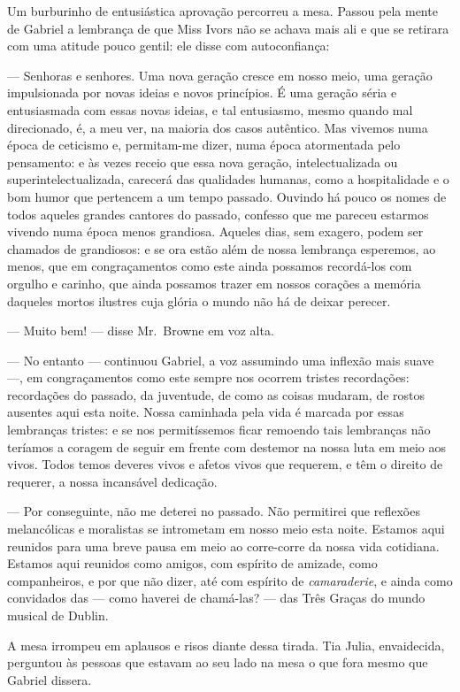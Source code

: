 Um burburinho de entusiástica aprovação percorreu a mesa.  Passou pela mente de
Gabriel a lembrança de que Miss Ivors não se achava mais ali e que se retirara
com uma atitude pouco gentil: ele disse com autoconfiança:

--- Senhoras e senhores.  Uma nova geração cresce em nosso meio, uma geração
impulsionada por novas ideias e novos princípios.  É uma geração séria e
entusiasmada com essas novas ideias, e tal entusiasmo, mesmo quando mal
direcionado, é, a meu ver, na maioria dos casos autêntico.  Mas vivemos numa
época de ceticismo e, permitam-me dizer, numa época atormentada pelo
pensamento: e às vezes receio que essa nova geração, intelectualizada ou
superintelectualizada, carecerá das qualidades humanas, como a hospitalidade e
o bom humor que pertencem a um tempo passado.  Ouvindo há pouco os nomes de
todos aqueles grandes cantores do passado, confesso que me pareceu estarmos
vivendo numa época menos grandiosa.  Aqueles dias, sem exagero, podem ser
chamados de grandiosos: e se ora estão além de nossa lembrança esperemos, ao
menos, que em congraçamentos como este ainda possamos recordá-los com orgulho e
carinho, que ainda possamos trazer em nossos corações a memória daqueles mortos
ilustres cuja glória o mundo não há de deixar perecer.

--- Muito bem! --- disse Mr.~Browne em voz alta.

--- No entanto --- continuou Gabriel, a voz assumindo uma inflexão mais suave
---, em congraçamentos como este sempre nos ocorrem tristes recordações:
recordações do passado, da juventude, de como as coisas mudaram, de rostos
ausentes aqui esta noite.  Nossa caminhada pela vida é marcada por essas
lembranças tristes: e se nos permitíssemos ficar remoendo tais lembranças não
teríamos a coragem de seguir em frente com destemor na nossa luta em meio aos
vivos.  Todos temos deveres vivos e afetos vivos que requerem, e têm o direito
de requerer, a nossa incansável dedicação.

--- Por conseguinte, não me deterei no passado.  Não permitirei que reflexões
melancólicas e moralistas se intrometam em nosso meio esta noite.  Estamos aqui
reunidos para uma breve pausa em meio ao corre-corre da nossa vida cotidiana.
Estamos aqui reunidos como amigos, com espírito de amizade, como companheiros,
e por que não dizer, até com espírito de \textit{camaraderie}, e ainda como
convidados das --- como haverei de chamá-las? --- das Três Graças do mundo
musical de Dublin.

A mesa irrompeu em aplausos e risos diante dessa tirada.  Tia Julia,
envaidecida, perguntou às pessoas que estavam ao seu lado na mesa o que fora
mesmo que Gabriel dissera.

